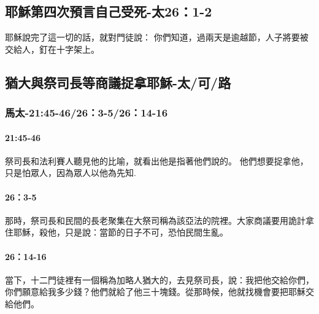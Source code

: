 


\subsection{耶穌第四次預言自己受死-太26：1-2}
耶穌說完了這一切的話，就對門徒說：
你們知道，過兩天是逾越節，人子將要被交給人，釘在十字架上。





\subsection{猶大與祭司長等商議捉拿耶穌-太/可/路}
\subsubsection{馬太-21:45-46/26：3-5/26：14-16}
\paragraph{21:45-46}
祭司長和法利賽人聽見他的比喻，就看出他是指著他們說的。
他們想要捉拿他，只是怕眾人，因為眾人以他為先知.
\paragraph{26：3-5}
那時，祭司長和民間的長老聚集在大祭司稱為該亞法的院裡。大家商議要用詭計拿住耶穌，殺他，只是說：當節的日子不可，恐怕民間生亂。%
\paragraph{26：14-16}
當下，十二門徒裡有一個稱為加略人猶大的，去見祭司長，說：我把他交給你們，你們願意給我多少錢？他們就給了他三十塊錢。從那時候，他就找機會要把耶穌交給他們。%
